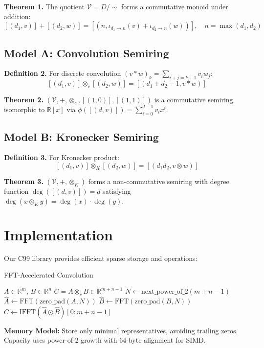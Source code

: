 \documentclass[sigconf]{acmart}
\begin{document}
\textbf{Theorem 1.} The quotient $\mathcal{V} = D/\sim$ forms a commutative monoid under addition:
\[[(d_1,v)] + [(d_2,w)] = [(n, \iota_{d_1 \to n}(v) + \iota_{d_2 \to n}(w))], \quad n = \max(d_1,d_2)\]

\subsection{Model A: Convolution Semiring}

\textbf{Definition 2.} For discrete convolution $(v * w)_k = \sum_{i+j=k+1} v_i w_j$:
\[[(d_1,v)] \otimes_c [(d_2,w)] = [(d_1+d_2-1, v * w)]\]

\textbf{Theorem 2.} $(\mathcal{V}, +, \otimes_c, [(1,0)], [(1,1)])$ is a commutative semiring isomorphic to $\mathbb{R}[x]$ via $\phi([(d,v)]) = \sum_{i=0}^{d-1} v_i x^i$.

\subsection{Model B: Kronecker Semiring}

\textbf{Definition 3.} For Kronecker product:
\[[(d_1,v)] \otimes_K [(d_2,w)] = [(d_1 d_2, v \otimes w)]\]

\textbf{Theorem 3.} $(\mathcal{V}, +, \otimes_K)$ forms a non-commutative semiring with degree function $\deg([(d,v)]) = d$ satisfying $\deg(x \otimes_K y) = \deg(x) \cdot \deg(y)$.

\section{Implementation}

Our C99 library provides efficient sparse storage and operations:

\begin{algorithm}
\caption{FFT-Accelerated Convolution}
\begin{algorithmic}[1]
\REQUIRE $A \in \mathbb{R}^m$, $B \in \mathbb{R}^n$
\ENSURE $C = A \otimes_c B \in \mathbb{R}^{m+n-1}$
\STATE $N \leftarrow \text{next\_power\_of\_2}(m + n - 1)$
\STATE $\hat{A} \leftarrow \text{FFT}(\text{zero\_pad}(A, N))$
\STATE $\hat{B} \leftarrow \text{FFT}(\text{zero\_pad}(B, N))$
\STATE $C \leftarrow \text{IFFT}(\hat{A} \odot \hat{B})[0:m+n-1]$
\end{algorithmic}
\end{algorithm}

\textbf{Memory Model:} Store only minimal representatives, avoiding trailing zeros. Capacity uses power-of-2 growth with 64-byte alignment for SIMD.
\end{document}
